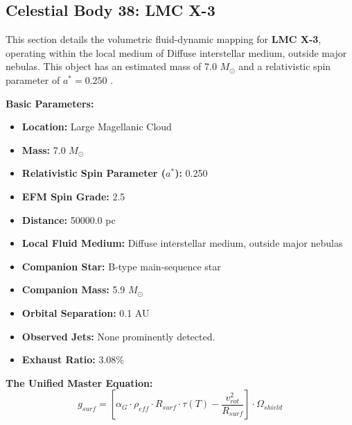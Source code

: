 \documentclass[11pt, a4paper]{article}
\begin{document}
\clearpage
\subsection{Celestial Body 38: LMC X-3}
This section details the volumetric fluid-dynamic mapping for \textbf{LMC X-3}, operating within the local medium of Diffuse interstellar medium, outside major nebulas. This object has an estimated mass of 7.0 $M_{\odot}$ and a relativistic spin parameter of $a^* = 0.250$ \cite{orosz2014, simbad}.

\vspace{0.5em}
\noindent \textbf{Basic Parameters:}
\begin{itemize}
  \item \textbf{Location:} Large Magellanic Cloud
  \item \textbf{Mass:} 7.0 $M_{\odot}$
  \item \textbf{Relativistic Spin Parameter ($a^*$):} 0.250
  \item \textbf{EFM Spin Grade:} 2.5
  \item \textbf{Distance:} 50000.0 pc
  \item \textbf{Local Fluid Medium:} Diffuse interstellar medium, outside major nebulas
  \item \textbf{Companion Star:} B-type main-sequence star
  \item \textbf{Companion Mass:} 5.9 $M_{\odot}$
  \item \textbf{Orbital Separation:} 0.1 AU
  \item \textbf{Observed Jets:} None prominently detected.
  \item \textbf{Exhaust Ratio:} 3.08\%
\end{itemize}

\vspace{0.5em}
\noindent \textbf{The Unified Master Equation:}
$$ g_{surf} = \left[ \alpha_G \cdot \rho_{eff} \cdot R_{surf} \cdot \tau(T) - \frac{v_{rot}^2}{R_{surf}} \right] \cdot \Omega_{shield} $$
\end{document}
